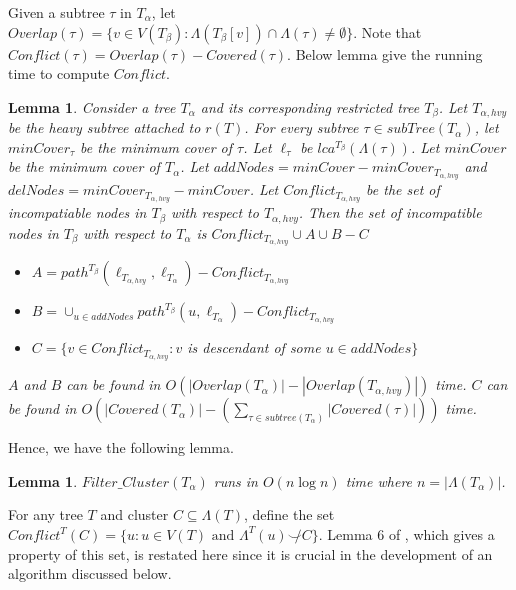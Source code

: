 \documentclass[final,1p,times]{elsarticle}
\newcommand{\compatible}{\smile}
\newcommand{\leafset}{\Lambda}
\newtheorem{lemma}[theorem]{Lemma}
\begin{document}
    Given a subtree $\tau$ in $T_{\alpha}$, let $Overlap(\tau) = \{ v \in V(T_{\beta}) : \Lambda(T_{\beta}[v]) \cap \Lambda(\tau) \neq \emptyset \}$.
    Note that $Conflict(\tau) = Overlap(\tau) - Covered(\tau)$.
    Below lemma give the running time to compute $Conflict$.
    \begin{lemma}
	    Consider a tree $T_{\alpha}$ and its corresponding restricted tree $T_{\beta}$. Let $T_{\alpha,hvy}$ be the heavy subtree attached to $r(T)$.
	    For every subtree $\tau \in subTree(T_{\alpha})$, let $minCover_{\tau}$ be the minimum cover of $\tau$.
	    Let $\ell_{\tau}$ be $lca^{T_{\beta}}(\Lambda(\tau))$.
	    Let $minCover$ be the minimum cover of $T_{\alpha}$.
	    Let $addNodes = minCover - minCover_{T_{\alpha,hvy}}$ and $delNodes = minCover_{T_{\alpha,hvy}} - minCover$.
	    Let $Conflict_{T_{\alpha,hvy}}$ be the set of incompatiable nodes in $T_{\beta}$ with respect to $T_{\alpha,hvy}$.
	    Then the set of incompatible nodes in $T_{\beta}$ with respect to $T_{\alpha}$ is $Conflict_{T_{\alpha,hvy}} \cup A \cup B - C$
	    \begin{itemize}
		    \item  $A = path^{T_{\beta}}(\ell_{T_{\alpha,hvy}}, \ell_{T_{\alpha}} ) - Conflict_{T_{\alpha,hvy}}$
		    \item $B = \cup_{u \in addNodes} path^{T_{\beta}}(u, \ell_{T_{\alpha}} ) - Conflict_{T_{\alpha,hvy}}$
		    \item $C = \{ v \in Conflict_{T_{\alpha,hvy}} : v$ is descendant of some $u \in addNodes \}$
	    \end{itemize}
	    $A$ and $B$ can be found in $O(|Overlap(T_{\alpha})| - |Overlap(T_{\alpha,hvy})|)$ time.
	    $C$ can be found in $O(|Covered(T_{\alpha})| - \left( \sum_{\tau \in subtree(T_{\alpha})} |Covered(\tau)| \right) )$ time.
    \end{lemma}

    Hence, we have the following lemma.
    \begin{lemma}
	    $Filter\_Cluster(T_{\alpha})$ runs in $O(n \log n)$ time where $n = |\Lambda(T_{\alpha})|$.
    \end{lemma}


    \newpage


        For any tree $T$ and cluster $C \subseteq \leafset(T)$, define the set $Conflict^{T}(C) = \{u : u \in V(T) \text{ and } \leafset^{T}(u) \not\compatible C\}$. Lemma 6 of \cite{jansson2018algorithms}, which gives a property of this set, is restated here since it is crucial in the development of an algorithm discussed below.
    \newline
\end{document}
